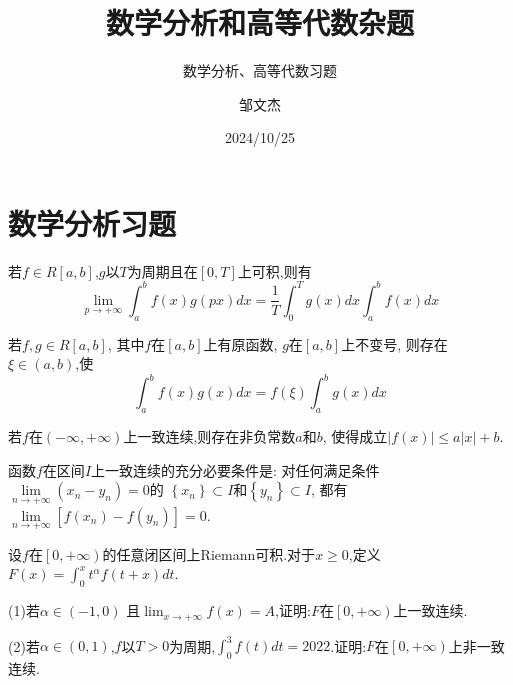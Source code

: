 \documentclass[lang=cn,newtx,10pt,scheme=chinese]{elegantbook}
\title{数学分析和高等代数杂题}
\subtitle{数学分析、高等代数习题}
\author{邹文杰}
\institute{无}
\date{2024/10/25}
\begin{document}
\maketitle
\frontmatter

\tableofcontents

\mainmatter
\everymath{\displaystyle} %


\chapter{数学分析习题}

\begin{theorem}[Riemann 定理] \label{thm:Riemann}
  若$f\in R\left[ a,b \right] $,$g$以$T$为周期且在$\left[ 0,T \right] $上可积,则有
  \begin{equation}
    \underset{p\rightarrow +\infty}{\lim}\int_a^b{f\left( x \right) g\left( px \right) dx=\frac{1}{T}}\int_0^T{g\left( x \right) dx}\int_a^b{f\left( x \right) dx}
  \end{equation}
\end{theorem}

\begin{theorem}[积分第一中值定理的推广] \label{thm:JFDYZZ}
  若$f,g\in R\left[ a,b \right] $,
  其中$f$在$\left[ a,b \right] $上有原函数,
  $g$在$\left[ a,b \right] $上不变号,
  则存在$\xi \in \left( a,b \right) $,使
  \begin{equation}
    \int_a^b{f\left( x \right) g\left( x \right) dx}=f\left( \xi \right) \int_a^b{g\left( x \right) dx}
  \end{equation}
\end{theorem}

\begin{proposition} \label{pro:YZLXHS}
  若$f$在$\left( -\infty ,+\infty \right) $上一致连续,则存在非负常数$a$和$b$,
  使得成立$\left| f\left( x \right) \right|\leqslant a\left| x \right|+b$.
\end{proposition}

\begin{proposition} \label{pro:HSYZLXCYTJ}
  函数$f$在区间$I$上一致连续的充分必要条件是:
  对任何满足条件$\underset{n\rightarrow +\infty}{\lim}\left( x_n-y_n \right) =0$的
  $\left\{ x_n \right\} \subset I$和$\left\{ y_n \right\} \subset I$,
  都有$\underset{n\rightarrow +\infty}{\lim}\left[ f\left( x_n \right) -f\left( y_n \right) \right] =0$.
\end{proposition}


\newpage
\begin{example}
  设$f$在$\left[ 0,+\infty \right)$的任意闭区间上Riemann可积.对于$x\geqslant 0$,定义$F\left( x \right) =\int_0^x{t^{\alpha}}f\left( t+x \right) dt$.
  
  (1)若$\alpha \in \left( -1,0 \right)$ 且$\lim_{x\rightarrow +\infty} f\left( x \right) =A$,证明:$F$在$\left[ 0,+\infty \right) $上一致连续.
  
  (2)若$\alpha \in \left( 0,1 \right)$,$f$以$T>0$为周期,$\int_0^3{f\left( t \right) dt}=2022$.证明:$F$在$\left[ 0,+\infty \right) $上非一致连续.
\end{example}
\end{document}
